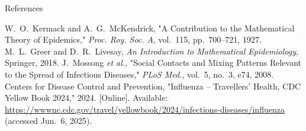 \documentclass[14pt,aspectratio=169]{beamer}
\begin{document}
\begin{frame}[allowframebreaks]{References}
  \begin{thebibliography}{9}
     W.~O.~Kermack and A.~G.~McKendrick,
      "A Contribution to the Mathematical Theory of Epidemics,"
      \textit{Proc. Roy. Soc. A}, vol.~115, pp.~700--721, 1927.
     M.~L.~Greer and D.~R.~Livesay,
      \textit{An Introduction to Mathematical Epidemiology}, Springer, 2018.
     J.~Mossong \textit{et al.},
      "Social Contacts and Mixing Patterns Relevant to the Spread of Infectious Diseases,"
      \textit{PLoS Med.}, vol.~5, no.~3, e74, 2008.
     Centers for Disease Control and Prevention,
      "Influenza – Travellers’ Health, CDC Yellow Book 2024," 2024.
      [Online]. Available: \url{https://wwwnc.cdc.gov/travel/yellowbook/2024/infections-diseases/influenza}
      (accessed Jun.~6, 2025).
  \end{thebibliography}
\end{frame}
\end{document}
